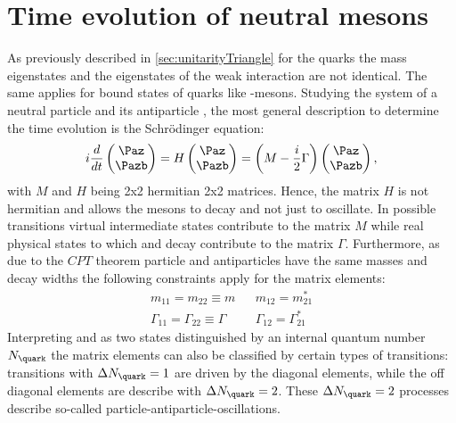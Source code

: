 \section[head={Time evolution of neutral mesons},tocentry={Time evolution of neutral mesons}]{Time evolution of neutral mesons}
\label{sec:TimeEvolution}

As previously described in \cref{sec:unitarityTriangle} for the quarks the mass eigenstates and the eigenstates of the weak interaction are not identical.
The same applies for bound states of quarks like \B-mesons.
Studying the system of a neutral particle \Paz and its antiparticle \Pazb, the most general description to determine the time evolution is the Schrödinger equation:
\begin{equation}
i\frac{d}{dt}\begin{pmatrix} \Paz \\ \Pazb \end{pmatrix} = H \begin{pmatrix} \Paz \\ \Pazb \end{pmatrix}
=\left(M-\frac{i}{2}\Gamma\right)\begin{pmatrix} \Paz \\ \Pazb \end{pmatrix}, \label{eq:mixMatrix}
\end{equation}
with $M$ and $H$ being 2x2 hermitian 2x2 matrices.
Hence, the matrix $H$ is not hermitian and allows the \B mesons to decay and not just to oscillate.
In possible transitions virtual intermediate states contribute to the matrix $M$ while real physical states to which \Paz and \Pazb decay contribute to the matrix $\Gamma$.
Furthermore, as due to the $CPT$ theorem particle and antiparticles have the same masses and decay widths the following constraints apply for the matrix elements:
\begin{equation}
\begin{aligned}
&m_{11}=m_{22}\equiv m&&m_{12}=m_{21}^\ast&\\
&\Gamma_{11}=\Gamma_{22}\equiv\Gamma&&\Gamma_{12}=\Gamma_{21}^\ast&
\end{aligned}
\end{equation}
Interpreting \Paz and \Pazb as two states distinguished by an internal quantum number $N_\quark$ the matrix elements can also be classified by certain types of transitions:
transitions with $\Delta N_\quark=1$ are driven by the diagonal elements, while the off diagonal elements are describe with $\Delta N_\quark=2$.
These $\Delta N_\quark=2$ processes describe so-called particle-antiparticle-oscillations.

